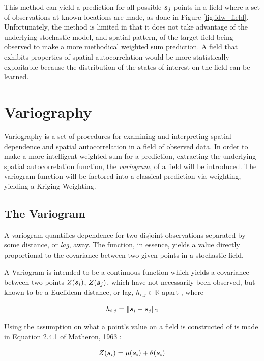 This method can yield a prediction for all possible ${\it{\boldsymbol{s}}}_j$ points in a field where a set of observations at known locations are made, as done in Figure \ref{fig:idw_field}. Unfortunately, the method is limited in that it does not take advantage of the underlying stochastic model, and spatial pattern, of the target field being observed to make a more methodical weighted sum prediction. A field that exhibits properties of spatial autocorrelation would be more statistically exploitable because the distribution of the states of interest on the field can be learned.

\section{Variography} \label{sec:vario}
Variography is a set of procedures for examining and interpreting spatial dependence and spatial autocorrelation in a field of observed data. In order to make a more intelligent weighted sum for a prediction, extracting the underlying spatial autocorrelation function, the \textit{variogram}, of a field will be introduced. The variogram function will be factored into a classical prediction via weighting, yielding a Kriging Weighting.

\subsection{The Variogram}
A variogram quantifies dependence for two disjoint observations separated by some distance, or \textit{lag}, away. The function, in essence, yields a value directly proportional to the covariance between two given points in a stochastic field.

A Variogram is intended to be a continuous function which yields a covariance between two points $Z({\it{\boldsymbol{s}}}_{i})$, $Z({\it{\boldsymbol{s}}}_{j})$, which have not necessarily been observed, but known to be a Euclidean distance, or lag, $h_{i,j} \in \mathbb{R}$ apart \cite{deutsch:geostat}, where

\begin{equation}
h_{i,j} = \| {\it{\boldsymbol{s}}}_i - {\it{\boldsymbol{s}}}_j \|_2
\label{eq:hdist}
\end{equation}

Using the assumption on what a point's value on a field is constructed of is made in Equation 2.4.1 of Matheron, 1963 \cite{matheron:geostat}:

\begin{equation}
    Z({\it{\boldsymbol{s}}}_i)=\mu({\it{\boldsymbol{s}}}_i)+\theta({\it{\boldsymbol{s}}}_i)
    \label{eq:matheron:assum}
\end{equation}

